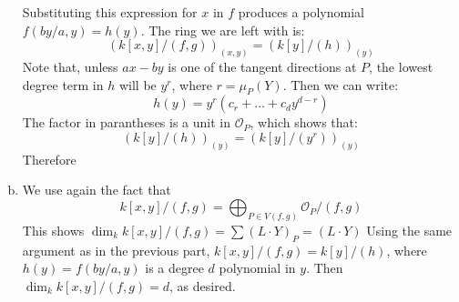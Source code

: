 \documentclass{mathnotes}
\begin{document}
\begin{enumerate}[(a)]
	Substituting this expression for $x$ in $f$ produces a polynomial $f(by/a, y) = h(y)$. The ring we are left with is:
	\[	\left(k[x,y]/(f,g)\right)_{(x,y)} = \left(k[y]/(h)\right)_{(y)}	\]
	Note that, unless $ax-by$ is one of the tangent directions at $P$, the lowest degree term in $h$ will be $y^r$,
	where $r = \mu_P(Y)$. Then we can write:
	\[      h(y) = y^r( c_r + \dots + c_d y^{d-r})       \]
	The factor in parantheses is a unit in $\mathcal{O}_P$, which shows that:
	\[       \left(k[y]/(h)\right)_{(y)} =   \left(k[y]/(y^r)\right)_{(y)}     \]
	Therefore 
\item We use again the fact that
	\[        k[x,y]/(f,g) = \bigoplus_{P \in V(f,g)} \mathcal{O}_P /(f,g)      \]
	This shows $\dim_k k[x,y]/(f,g) = \sum (L \cdot Y)_P = (L \cdot Y)$ Using the same argument as in the 
	previous part, $k[x,y]/(f,g) = k[y]/(h)$, where $h(y) = f(by/a, y)$ is a degree $d$ polynomial in $y$. Then
	$\dim_k k[x,y]/(f,g) = d$, as desired.
\end{enumerate}
\end{document}
